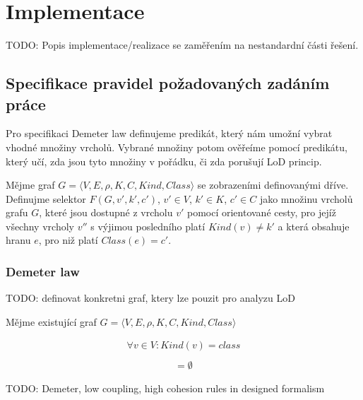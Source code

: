 \chapter{Implementace}

TODO: Popis implementace/realizace se zaměřením na nestandardní části řešení.

\section{Specifikace pravidel požadovaných zadáním práce}
Pro specifikaci Demeter law definujeme predikát, který nám umožní vybrat vhodné množiny vrcholů. Vybrané množiny potom ověřeíme pomocí predikátu, který učí, zda jsou tyto množiny v pořádku, či zda porušují LoD princip.

\begin{definition}
Mějme graf $G = \langle V, E, \rho, K, C, \mathit{Kind}, \mathit{Class}\rangle$ se zobrazeními definovanými dříve. Definujme selektor $F(G, v', k', c')$, $v' \in V$, $k' \in K$, $c' \in C$ jako množinu vrcholů grafu $G$, které jsou dostupné z vrcholu $v'$ pomocí orientované cesty, pro jejíž všechny vrcholy $v''$ s výjimou posledního platí $Kind(v) \ne k'$ a která obsahuje hranu $e$, pro niž platí $Class(e) = c' $.
\end{definition}

\subsection{Demeter law}
TODO: definovat konkretni graf, ktery lze pouzit pro analyzu LoD

Mějme existující graf $G = \langle V, E, \rho, K, C, \mathit{Kind}, \mathit{Class}\rangle$

\begin{align*}
\forall v \in V: Kind(v) = class\\
\end{align*}
\begin{align*}
[((&F(G, v, class, has\_field) \cup F(G, v class, has\_param) \cup\\
&F(G, v, class, instantiates)) \cap F(v, class, uses) \setminus v] = \emptyset
\end{align*}

TODO: Demeter, low coupling, high cohesion rules in designed formalism

